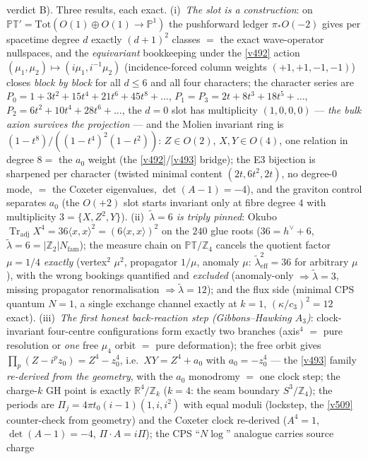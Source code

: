 \documentclass[11pt,a4paper]{article}
\newcommand{\cthree}{c_3}
\newcommand{\Z}{\mathbb Z}
\begin{document}
\begin{itemize}
\begin{itemize}
verdict B). Three results, each exact. (i)~\emph{The slot is a construction}: on
$\mathbb{PT}'=\mathrm{Tot}(O(1){\oplus}O(1)\to\mathbb P^1)$ the pushforward ledger
$\pi_*O(-2)$ gives per spacetime degree $d$ exactly $(d{+}1)^2$ classes $=$ the exact
wave-operator nullspaces, and the \emph{equivariant} bookkeeping under the \vref{v492} action
$(\mu_1,\mu_2)\mapsto(i\mu_1,i^{-1}\mu_2)$ (incidence-forced column weights $(+1,+1,-1,-1)$)
closes \emph{block by block} for all $d\le6$ and all four characters; the character series are
$P_0=1+3t^2+15t^4+21t^6+45t^8+\dots$, $P_1=P_3=2t+8t^3+18t^5+\dots$,
$P_2=6t^2+10t^4+28t^6+\dots$, the $d=0$ slot has multiplicity $(1,0,0,0)$ --- \emph{the bulk
axion survives the projection} --- and the Molien invariant ring is
$(1-t^8)/((1-t^4)^2(1-t^2))$: $Z\in O(2)$, $X,Y\in O(4)$, one relation in degree $8=$ the $a_0$
weight (the \vref{v492}/\vref{v493} bridge); the E3 bijection is sharpened per character (twisted
minimal content $(2t,6t^2,2t)$, no degree-$0$ mode, $=$ the Coxeter eigenvalues,
$\det(A-1)=-4$), and the graviton control separates $a_0$ (the $O(+2)$ slot starts invariant only
at fibre degree $4$ with multiplicity $3=\{X,Z^2,Y\}$). (ii)~\emph{$\tilde\lambda=6$ is triply
pinned}: Okubo $\operatorname{Tr}_{\mathrm{adj}}X^4=36\langle x,x\rangle^2
=(6\langle x,x\rangle)^2$ on the $240$ glue roots ($36=h^\vee+6$,
$\tilde\lambda=6=|\Z_2|N_{\mathrm{fam}}$); the measure chain on $\mathbb{PT}/\Z_4$ cancels the
quotient factor $\mu=1/4$ \emph{exactly} (vertex$^2$ $\mu^2$, propagator $1/\mu$, anomaly $\mu$:
$\tilde\lambda_{\mathrm{eff}}^2=36$ for arbitrary $\mu$), with the wrong bookings quantified and
\emph{excluded} (anomaly-only $\Rightarrow\tilde\lambda=3$, missing propagator renormalisation
$\Rightarrow\tilde\lambda=12$); and the flux side (minimal CPS quantum $N=1$, a single exchange
channel exactly at $k=1$, $(\kappa/\cthree)^2=12$ exact). (iii)~\emph{The first honest
back-reaction step (Gibbons--Hawking $A_3$)}: clock-invariant four-centre configurations form
exactly two branches (axis$^4$ $=$ pure resolution or \emph{one} free $\mu_4$ orbit $=$ pure
deformation); the free orbit gives $\prod_p(Z-i^pz_0)=Z^4-z_0^4$, i.e.\ $XY=Z^4+a_0$ with
$a_0=-z_0^4$ --- the \vref{v493} family \emph{re-derived from the geometry}, with the $a_0$
monodromy $=$ one clock step; the charge-$k$ GH point is exactly $\mathbb R^4/\Z_k$ ($k=4$: the
seam boundary $S^3/\Z_4$); the periods are $\Pi_j=4\pi t_0(i-1)(1,i,i^2)$ with equal moduli
(lockstep, the \vref{v509} counter-check from geometry) and the Coxeter clock re-derived
($A^4=1$, $\det(A-1)=-4$, $\Pi\cdot A=i\Pi$); the CPS ``$N\log$'' analogue carries source charge

\end{itemize}
\end{itemize}
\end{document}
